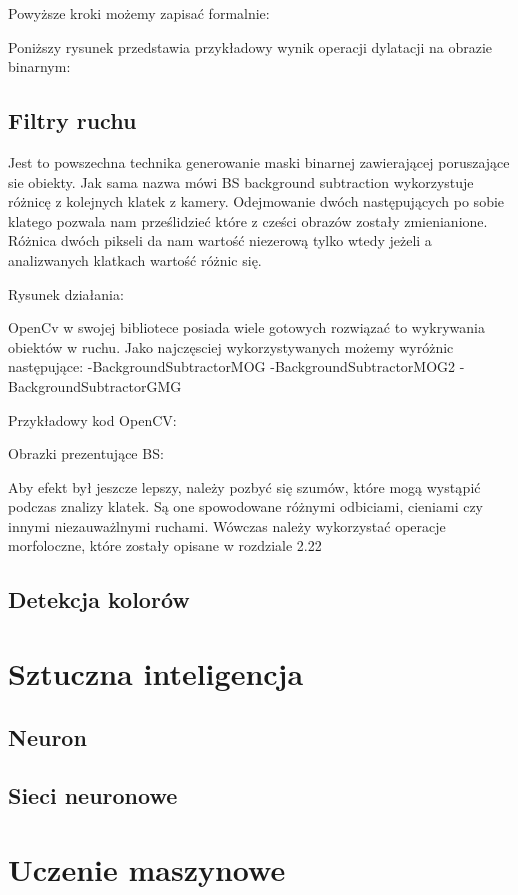 \documentclass[a4paper,12pt,twoside,openany]{report}
\begin{document}
Powyższe kroki możemy zapisać formalnie:

Poniższy rysunek przedstawia przykładowy wynik operacji dylatacji na obrazie binarnym:

\subsection{Filtry ruchu}
Jest to powszechna technika generowanie maski binarnej zawierającej poruszające sie obiekty. Jak sama nazwa mówi BS background subtraction wykorzystuje różnicę z kolejnych klatek z kamery. Odejmowanie dwóch następujących po sobie klatego pozwala nam prześlidzieć które z cześci obrazów zostały zmienianione. Różnica dwóch pikseli da nam wartość niezerową tylko wtedy jeżeli a analizwanych klatkach wartość różnic się. 

Rysunek działania:

OpenCv w swojej bibliotece posiada wiele gotowych rozwiązać to wykrywania obiektów w ruchu. Jako najczęsciej wykorzystywanych możemy wyróżnic następujące:
-BackgroundSubtractorMOG
-BackgroundSubtractorMOG2
-BackgroundSubtractorGMG

Przykładowy kod OpenCV:


Obrazki prezentujące BS:

Aby efekt był jeszcze lepszy, należy pozbyć się szumów, które mogą wystąpić podczas znalizy klatek. Są one spowodowane różnymi odbiciami, cieniami czy innymi niezauważlnymi ruchami. Wówczas należy wykorzystać operacje morfoloczne, które zostały opisane w rozdziale 2.22

\subsection{Detekcja kolorów}
\section{Sztuczna inteligencja}
\subsection{Neuron}
\subsection{Sieci neuronowe}

\section{Uczenie maszynowe}
\end{document}
